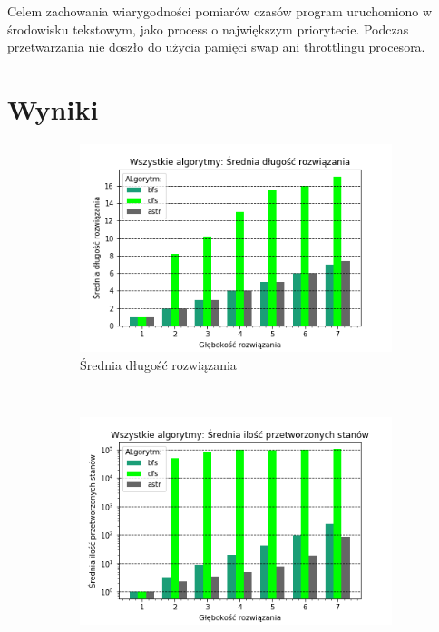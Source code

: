 \documentclass{classrep}
\begin{document}
Celem zachowania wiarygodności pomiarów czasów program uruchomiono w środowisku tekstowym, jako process o największym priorytecie.
Podczas przetwarzania nie doszło do użycia pamięci swap ani throttlingu procesora.
\section{Wyniki}
\begin{figure}[H]
    \centering
    \begin{subfigure}[t]{0.45\textwidth}
        \includegraphics[width=\textwidth]{charts/ALL_path_length.png}
        \caption{Średnia długość rozwiązania}
        \label{ALL:path_length}
    \end{subfigure}
    ~ %
    \begin{subfigure}[t]{0.45\textwidth}
        \includegraphics[width=\textwidth]{charts/ALL_processed.png}

\end{subfigure}
\end{figure}
\end{document}
